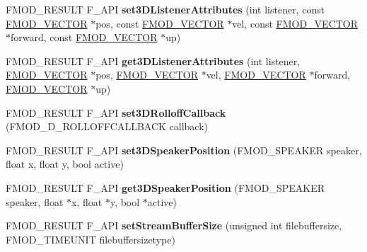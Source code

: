 \begin{DoxyCompactItemize}
\item 
F\+M\+O\+D\+\_\+\+R\+E\+S\+U\+LT F\+\_\+\+A\+PI {\bfseries set3\+D\+Listener\+Attributes} (int listener, const \hyperlink{struct_f_m_o_d___v_e_c_t_o_r}{F\+M\+O\+D\+\_\+\+V\+E\+C\+T\+OR} $\ast$pos, const \hyperlink{struct_f_m_o_d___v_e_c_t_o_r}{F\+M\+O\+D\+\_\+\+V\+E\+C\+T\+OR} $\ast$vel, const \hyperlink{struct_f_m_o_d___v_e_c_t_o_r}{F\+M\+O\+D\+\_\+\+V\+E\+C\+T\+OR} $\ast$forward, const \hyperlink{struct_f_m_o_d___v_e_c_t_o_r}{F\+M\+O\+D\+\_\+\+V\+E\+C\+T\+OR} $\ast$up)\hypertarget{class_f_m_o_d_1_1_system_a0e24af3c714aab78000e13cf522a3bfc}{}\label{class_f_m_o_d_1_1_system_a0e24af3c714aab78000e13cf522a3bfc}

\item 
F\+M\+O\+D\+\_\+\+R\+E\+S\+U\+LT F\+\_\+\+A\+PI {\bfseries get3\+D\+Listener\+Attributes} (int listener, \hyperlink{struct_f_m_o_d___v_e_c_t_o_r}{F\+M\+O\+D\+\_\+\+V\+E\+C\+T\+OR} $\ast$pos, \hyperlink{struct_f_m_o_d___v_e_c_t_o_r}{F\+M\+O\+D\+\_\+\+V\+E\+C\+T\+OR} $\ast$vel, \hyperlink{struct_f_m_o_d___v_e_c_t_o_r}{F\+M\+O\+D\+\_\+\+V\+E\+C\+T\+OR} $\ast$forward, \hyperlink{struct_f_m_o_d___v_e_c_t_o_r}{F\+M\+O\+D\+\_\+\+V\+E\+C\+T\+OR} $\ast$up)\hypertarget{class_f_m_o_d_1_1_system_af141ec87d96230c1c445d6e3c2de224a}{}\label{class_f_m_o_d_1_1_system_af141ec87d96230c1c445d6e3c2de224a}

\item 
F\+M\+O\+D\+\_\+\+R\+E\+S\+U\+LT F\+\_\+\+A\+PI {\bfseries set3\+D\+Rolloff\+Callback} (F\+M\+O\+D\+\_\+D\+\_\+\+R\+O\+L\+L\+O\+F\+F\+C\+A\+L\+L\+B\+A\+CK callback)\hypertarget{class_f_m_o_d_1_1_system_a10491361e22c3fa6968e1ed43ca42dc5}{}\label{class_f_m_o_d_1_1_system_a10491361e22c3fa6968e1ed43ca42dc5}

\item 
F\+M\+O\+D\+\_\+\+R\+E\+S\+U\+LT F\+\_\+\+A\+PI {\bfseries set3\+D\+Speaker\+Position} (F\+M\+O\+D\+\_\+\+S\+P\+E\+A\+K\+ER speaker, float x, float y, bool active)\hypertarget{class_f_m_o_d_1_1_system_ab2f8b73ae39bf546ec187d9fef30de83}{}\label{class_f_m_o_d_1_1_system_ab2f8b73ae39bf546ec187d9fef30de83}

\item 
F\+M\+O\+D\+\_\+\+R\+E\+S\+U\+LT F\+\_\+\+A\+PI {\bfseries get3\+D\+Speaker\+Position} (F\+M\+O\+D\+\_\+\+S\+P\+E\+A\+K\+ER speaker, float $\ast$x, float $\ast$y, bool $\ast$active)\hypertarget{class_f_m_o_d_1_1_system_a49c0fcb3f0c3c0fb8c19c809b418ede3}{}\label{class_f_m_o_d_1_1_system_a49c0fcb3f0c3c0fb8c19c809b418ede3}

\item 
F\+M\+O\+D\+\_\+\+R\+E\+S\+U\+LT F\+\_\+\+A\+PI {\bfseries set\+Stream\+Buffer\+Size} (unsigned int filebuffersize, F\+M\+O\+D\+\_\+\+T\+I\+M\+E\+U\+N\+IT filebuffersizetype)\hypertarget{class_f_m_o_d_1_1_system_a3a1af0fad360c049a38df4abcb14380c}{}\label{class_f_m_o_d_1_1_system_a3a1af0fad360c049a38df4abcb14380c}


\end{DoxyCompactItemize}
